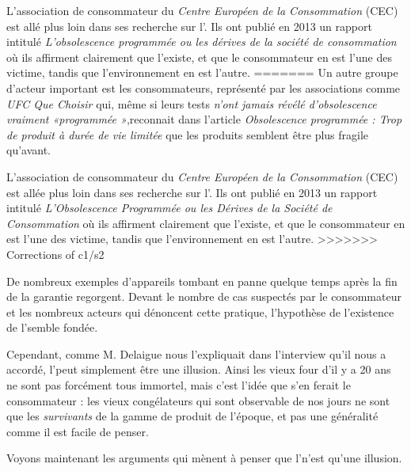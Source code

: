 L'association de consommateur du \textit{Centre Européen de la Consommation} (CEC) est allé plus loin dans ses recherche sur l'\op. Ils ont publié en 2013 un rapport\cite{cec-zevRapportObsProg}  intitulé \textit{L'obsolescence programmée ou les dérives de la société de consommation} où ils affirment clairement que l'\op existe, et que le consommateur en est l'une des victime, tandis que l'environnement en est l'autre. 
=======
\medbreak
Un autre groupe d'acteur important est les consommateurs, représenté par les associations comme \textit{UFC Que Choisir} qui, même si leurs tests \textit{n'ont jamais révélé d’obsolescence vraiment «programmée »},reconnait dans l'article \textit{Obsolescence programmée : Trop de produit à durée de vie limitée } que les produits semblent être plus fragile qu'avant. %

L'association de consommateur du \textit{Centre Européen de la Consommation} (CEC) est allée plus loin dans ses recherche sur l'\op. Ils ont publié en 2013 un rapport intitulé \textit{L'Obsolescence Programmée ou les Dérives de la Société de Consommation} où ils affirment clairement que l'\op existe, et que le consommateur en est l'une des victime, tandis que l'environnement en est l'autre. 
>>>>>>> Corrections of c1/s2

\medbreak

De nombreux exemples d'appareils tombant en panne quelque temps après la fin de la garantie regorgent. Devant le nombre de cas suspectés par le consommateur et les nombreux acteurs qui dénoncent cette pratique, l'hypothèse de l'existence de l'\op semble fondée. 

\bigbreak
Cependant, comme M. Delaigue nous l'expliquait dans l'interview qu'il nous a accordé, l'\op peut simplement être une illusion. Ainsi les vieux four d'il y a 20 ans ne sont pas forcément tous immortel, mais c'est l'idée que s'en ferait le consommateur : les vieux congélateurs qui sont observable de nos jours ne sont que les \textit{survivants } de la gamme de produit de l'époque, et pas une généralité comme il est facile de penser. 


Voyons maintenant les arguments qui mènent à penser que l'\op n'est qu'une illusion. 
